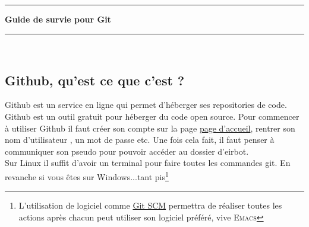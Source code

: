 \documentclass[a4paper,10pt]{article}
\newcommand{\HRule}{\rule{\linewidth}{0.1mm}}
\begin{document}
\begin{spacing}{1.5}
\graphicspath{{image/}}
\setcounter{tocdepth}{2}
\newpage
\pagestyle{fancy} \lhead{} 
\rhead{\thepage} \lfoot{} \cfoot{} 
\HRule
\begin{center}
  \LARGE \textbf{Guide de survie pour Git}
\end{center}
\HRule \\

\subsection*{Github, qu'est ce que c'est ?}
Github est un service en ligne qui permet d'héberger ses repositories de code.
Github est un outil gratuit pour héberger du code open source.
Pour commencer à utiliser Github il faut créer son compte sur la page
\href{https://github.com/join?source=header-home}{page d'accueil}, rentrer son
nom d'utilisateur , un mot de passe etc. Une fois cela fait, il faut
penser à communiquer son pseudo pour pouvoir accéder au dossier d'eirbot. \\
Sur Linux il suffit d'avoir un terminal pour faire toutes les commandes git. En
revanche si vous êtes sur Windows...tant pis\footnote{L'utilisation de logiciel
  comme \href{https://gitforwindows.org/}{Git SCM} permettra de réaliser toutes
  les actions après chacun peut utiliser son logiciel préféré, vive \textsc{Emacs}}


\end{spacing}
\end{document}
